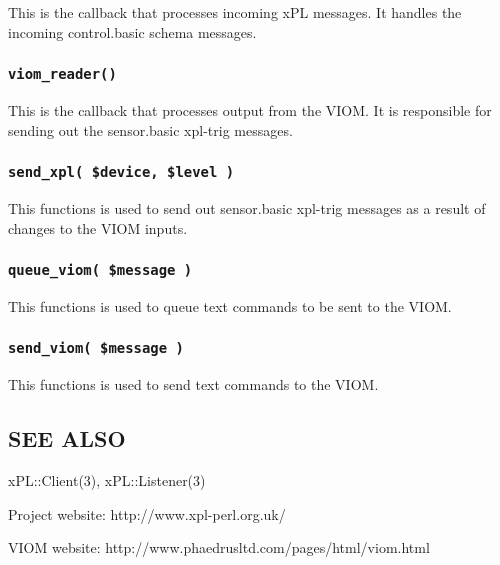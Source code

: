 This is the callback that processes incoming xPL messages.  It handles
the incoming control.basic schema messages.

\subsubsection*{\texttt{viom\_reader()}\label{xpl-viom_viom_reader_}}


This is the callback that processes output from the VIOM.  It is
responsible for sending out the sensor.basic xpl-trig messages.

\subsubsection*{\texttt{send\_xpl( \$device, \$level )}\label{xpl-viom_send_xpl_device_level_}}


This functions is used to send out sensor.basic xpl-trig messages as a
result of changes to the VIOM inputs.

\subsubsection*{\texttt{queue\_viom( \$message )}\label{xpl-viom_queue_viom_message_}}


This functions is used to queue text commands to be sent to the VIOM.

\subsubsection*{\texttt{send\_viom( \$message )}\label{xpl-viom_send_viom_message_}}


This functions is used to send text commands to the VIOM.

\subsection*{SEE ALSO\label{xpl-viom_SEE_ALSO}}


xPL::Client(3), xPL::Listener(3)



Project website: http://www.xpl-perl.org.uk/



VIOM website: http://www.phaedrusltd.com/pages/html/viom.html

